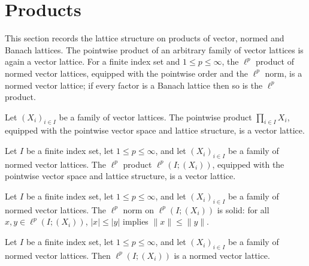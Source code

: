 \section{Products}

This section records the lattice structure on products of vector,
normed and Banach lattices. The pointwise product of an arbitrary
family of vector lattices is again a vector lattice. For a finite
index set and $1 \le p \le \infty$, the $\ell^p$ product of normed
vector lattices, equipped with the pointwise order and the $\ell^p$
norm, is a normed vector lattice; if every factor is a Banach
lattice then so is the $\ell^p$ product.

\begin{lemma}
\label{lem:pi-vectorLattice}
\leanok
{}
Let $(X_i)_{i \in I}$ be a family of vector lattices. The pointwise
product $\prod_{i \in I} X_i$, equipped with the pointwise vector
space and lattice structure, is a vector lattice.
\end{lemma}

\begin{lemma}
\label{lem:piLp-vectorLattice}
\leanok
{}
Let $I$ be a finite index set, let $1 \le p \le \infty$, and let
$(X_i)_{i \in I}$ be a family of normed vector lattices. The
$\ell^p$ product $\ell^p(I; (X_i))$, equipped with the pointwise
vector space and lattice structure, is a vector lattice.
\end{lemma}

\begin{lemma}
\label{lem:piLp-hasSolidNorm}
\leanok
Let $I$ be a finite index set, let $1 \le p \le \infty$, and let
$(X_i)_{i \in I}$ be a family of normed vector lattices. The
$\ell^p$ norm on $\ell^p(I; (X_i))$ is solid: for all
$x, y \in \ell^p(I; (X_i))$, $\lvert x \rvert \le \lvert y \rvert$
implies $\lVert x \rVert \le \lVert y \rVert$.
\end{lemma}

\begin{theorem}
\label{thm:piLp-normedVectorLattice}
\leanok
{}
Let $I$ be a finite index set, let $1 \le p \le \infty$, and let
$(X_i)_{i \in I}$ be a family of normed vector lattices. Then
$\ell^p(I; (X_i))$ is a normed vector lattice.
\end{theorem}

